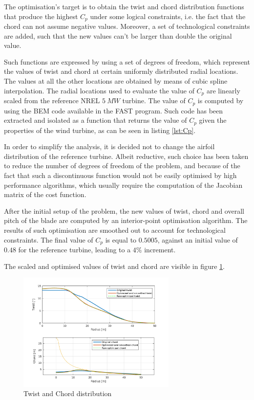 The optimisation's target is to obtain the twist and chord distribution functions that produce the highest $C_p$ under some logical constraints, i.e. the fact that the chord can not assume negative values. Moreover, a set of technological constraints are added, such that the new values can't be larger than double the original value. 

Such functions are expressed by using a set of degrees of freedom, which represent the values of twist and chord at certain uniformly distributed radial locations. The values at all the other locations are obtained by means of cubic spline interpolation. The radial locations used to evaluate the value of $C_p$ are linearly scaled from the reference NREL $5\ MW$ turbine. The value of $C_p$ is computed by using the BEM code available in the FAST program. Such code has been extracted and isolated as a function that returns the value of $C_p$ given the properties of the wind turbine, as can be seen in listing \ref{lst:Cp}.

In order to simplify the analysis, it is decided not to change the airfoil distribution of the reference turbine. Albeit reductive, such choice has been taken to reduce the number of degrees of freedom of the problem, and because of the fact that such a discontinuous function would not be easily optimised by high performance algorithms, which usually require the computation of the Jacobian matrix of the cost function.

After the initial setup of the problem, the new values of twist, chord and overall pitch of the blade are computed by an interior-point optimisation algorithm. The results of such optimisation are smoothed out to account for technological constraints. The final value of $C_p$ is equal to $0.5005$, against an initial value of $0.48$ for the reference turbine, leading to a $4\%$ increment.

The scaled and optimised values of twist and chord are visible in figure \ref{fig:twist_and_chord}.

\begin{figure}[H]
\centering
\includegraphics[width=0.7\textwidth]{Images/twist_and_chord.png} 
\caption{Twist and Chord distribution}\label{fig:twist_and_chord}
\end{figure}

